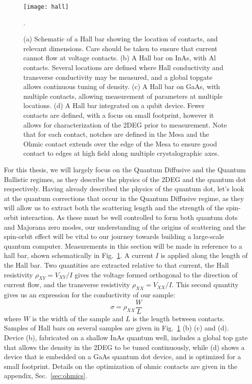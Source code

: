 \begin{figure}
  \texttt{[image: hall]}
  \caption[Schematic of a Hall bar and several devices]
  {\label{fig:hall}(a) Schematic of a Hall bar showing the location of contacts, and relevant dimensions. Care should be taken to ensure that
  current cannot flow at voltage contacts. (b) A Hall bar on InAs, with Al contacts. Several locations are defined where Hall conductivity and transverse conductivity
  may be measured, and a global topgate allows continuous tuning of density. (c) A Hall bar on GaAs, with multiple contacts, allowing
  measurement of parameters at multiple locations. (d) A Hall bar integrated on a qubit device. Fewer contacts are defined, with a focus on small
  footprint, however it allows for characterization of the 2DEG prior to measurement. Note that for each contact, notches are defined in the Mesa
  and the Ohmic contact extends over the edge of the Mesa to ensure good contact to edges at high field along multiple crystalographic axes.}.
\end{figure}

For this thesis, we will largely focus on the Quantum Diffusive and the Quantum Ballistic regimes, as they describe the physics of the
2DEG and the quantum dot respectively. Having already described the physics of the quantum dot, let's look at the quantum corrections that occur
in the Quantum Diffusive regime, as they will allow us to extract both the scattering length and the strength of the spin-orbit
interaction. As these must be well controlled to form both quantum dots and Majorana zero modes, our understanding of the origins of
scattering and the spin-orbit effect will be vital to our journey towards building a large-scale quantum computer. Measurements in this section
will be made in reference to a hall bar, shown schematically in Fig.~\ref{fig:hall}. A current $I$ is applied along the length of the Hall bar.
Two quantities are extracted relative to that current, the Hall resistivity $\rho_{XY} = V_{XY}/I$ gives
the voltage formed orthogonal to the direction of current flow, and the transverse resistivity $\rho_{XX} = V_{XX}/I$.
This second quantity gives us an expression for the conductivity of our sample:
\begin{equation}
  \sigma = \rho_{XX} \frac{W}{L}
\end{equation}
where $W$ is the width of the sample and $L$ is the length between contacts. Samples of Hall bars on several samples are given in Fig.~\ref{fig:hall} (b)
(c) and (d). Device (b), fabricated on a shallow InAs quantum well, includes a global top gate that allows the density in the 2DEG to be tuned continuously,
while (d) shows a device that is embedded on a GaAs quantum dot device, and is optimized for a small footprint. Details on the optimization of ohmic contacts
are given in the appendix, Sec.~\ref{sec:ohmics}.

